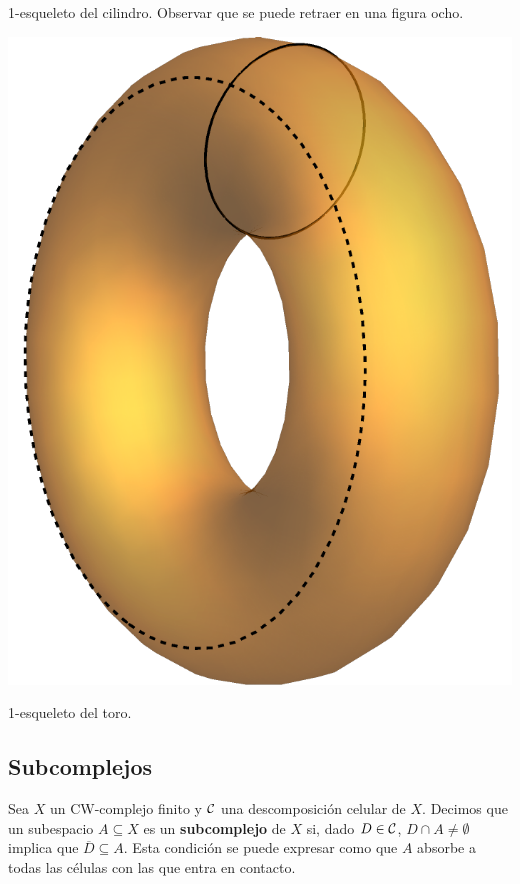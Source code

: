 \begin{marginfigure}

\caption[1-esqueleto del cilindro.]{1-esqueleto del cilindro. Observar que se
puede retraer en una figura ocho.}
\end{marginfigure}

\begin{marginfigure}
\includegraphics{figures/ToroGeneradoresOrden1.pdf}
\caption{1-esqueleto del toro.}
\end{marginfigure}

\subsection{Subcomplejos}
Sea $X$ un CW-complejo finito y $\mathcal{C}$ una descomposición celular de $X$.
Decimos que un subespacio $A \subseteq X$ es un \textbf{subcomplejo} de $X$ si,
dado $D \in \mathcal{C}$, $D\cap A \neq \emptyset$ implica que $\overline{D}
\subseteq A$. Esta condición se puede expresar como que $A$ absorbe a todas
las células con las que entra en contacto.

